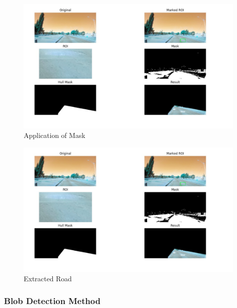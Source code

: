 \documentclass[journal]{IEEEtran}
\begin{document}
\begin{figure}[!h]
\begin{center}
\includegraphics[scale=0.25]{Images/roi.jpg}
\end{center}
\caption{Application of Mask}
\end{figure}

\begin{figure}[!h]
\begin{center}
\includegraphics[scale=0.25]{Images/roi.jpg}
\end{center}
\caption{Extracted Road}
\end{figure}

\subsubsection{Blob Detection Method}
\end{document}
